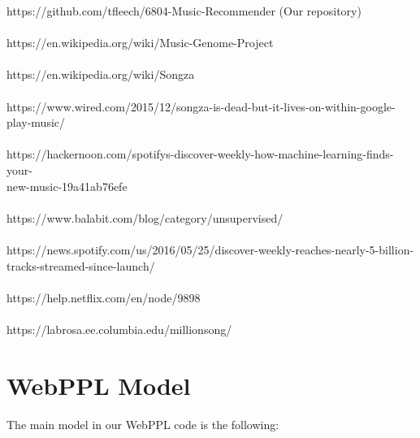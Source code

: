 \documentclass{amsart}
\theoremstyle{plain}
\theoremstyle{definition}
\begin{document}
   	\noindent [*] https://github.com/tfleech/6804-Music-Recommender (Our repository) \\ \\
   	\noindent [1] https://en.wikipedia.org/wiki/Music-Genome-Project \\ \\ 
    \noindent [2] https://en.wikipedia.org/wiki/Songza \\ \\
 	\noindent [3] https://www.wired.com/2015/12/songza-is-dead-but-it-lives-on-within-google-play-music/ \\ \\  	
   	\noindent [4] https://hackernoon.com/spotifys-discover-weekly-how-machine-learning-finds-your- \\ new-music-19a41ab76efe \\ \\
   	\noindent [5] https://www.balabit.com/blog/category/unsupervised/ \\ \\
   	\noindent [6] https://news.spotify.com/us/2016/05/25/discover-weekly-reaches-nearly-5-billion-tracks-streamed-since-launch/ \\ \\   
   	\noindent [7] https://help.netflix.com/en/node/9898 \\ \\	
   	\noindent [8] https://labrosa.ee.columbia.edu/millionsong/
   	
   	\section{WebPPL Model}
   	
   	\noindent The main model in our WebPPL code is the following: \\
   	
\end{document}
